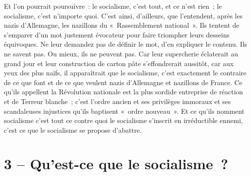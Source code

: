 \documentclass[french,twoside]{book} %
\newcommand\chapteropen{} %
\newcommand\chapterclose{} %
\begin{document}
Et l’on pourrait poursuivre : le socialisme, c’est tout, et ce n’est rien ; le socialisme, c’est n’importe quoi. C’est ainsi, d’ailleurs, que l’entendent, après les nazis d’Allemagne, les nazillons du « Rassemblement national ». Ils tentent de s’emparer d’un mot justement évocateur pour faire triompher leurs desseins équivoques. Ne leur demandez pas de définir   le mot, d’en expliquer le contenu. Ils ne savent pas. Ou mieux, ils ne peuvent pas. Car leur supercherie éclaterait au grand jour et leur construction de carton pâte s’effondrerait aussitôt, car aux yeux des plus naïfs, il apparaîtrait que le socialisme, c’est exactement le contraire de ce que font et de ce que veulent nazis d’Allemagne et nazillons de France. Ce qu’ils appellent la Révolution nationale est la plus sordide entreprise de réaction et de Terreur blanche ; c’est l’ordre ancien et ses privilèges immoraux et ses scandaleuses injustices qu’ils baptisent « ordre nouveau ». Et ce qu’ils nomment socialisme c’est tout ce contre quoi le socialisme s’inscrit en irréductible ennemi, c’est ce que le socialisme se propose d’abattre.
\chapterclose


\chapteropen
\chapter[{3 – Qu’est-ce que le socialisme ?}]{3 – Qu’est-ce que le socialisme ?}\renewcommand{\leftmark}{3 – Qu’est-ce que le socialisme ?}
\end{document}
